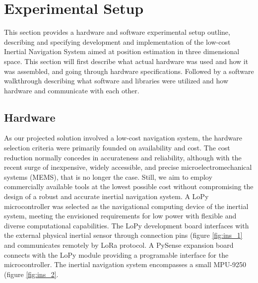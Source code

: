 \section{Experimental Setup}

This section provides a hardware and software experimental setup outline, describing and specifying development and implementation of the low-cost Inertial Navigation System aimed at position estimation in three dimensional space. This section will first describe what actual hardware was used and how it was assembled, and going through hardware specifications. Followed by a software walkthrough describing what software and libraries were utilized and how hardware and communicate with each other.


\subsection{Hardware}

As our projected solution involved a low-cost navigation system, the hardware selection criteria were primarily founded on availability and cost. The cost reduction normally concedes in accurateness and reliability, although with the recent surge of inexpensive, widely accessible, and precise microelectromechanical systems (MEMS), that is no longer the case. Still, we aim to employ commercially available tools at the lowest possible cost without compromising the design of a robust and accurate inertial navigation system. A LoPy microcontroller was selected as the navigational computing device of the inertial system, meeting the envisioned requirements for low power with flexible and diverse computational capabilities. The LoPy development board interfaces with the external physical inertial sensor through connection pins (figure \ref{fig:ins_1} and communicates remotely by LoRa protocol. A PySense expansion board connects with the LoPy module providing a programable interface for the microcontroller. The inertial navigation system encompasses a small MPU-9250 (figure \ref{fig:ins_2}.

